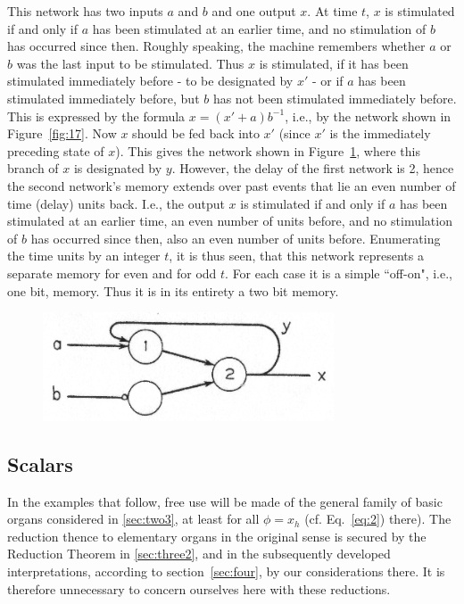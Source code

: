 \documentclass[twocolumn,preprintnumbers,amsmath,amssymb,floatfix]{revtex4}
\begin{document}
This network has two inputs $a$ and $b$ and one output $x$. At
time $t$, $x$ is stimulated if and only if $a$ has been stimulated
at an earlier time, and no stimulation of $b$ has occurred since
then. Roughly speaking, the machine remembers whether $a$ or $b$
was the last input to be stimulated. Thus $x$ is stimulated, if it
has been stimulated immediately before - to be designated by $x'$
- or if $a$ has been stimulated immediately before, but $b$ has
not been stimulated immediately before. This is expressed by the
formula $x=(x'+a)b^{-1}$, i.e., by the network shown in
Figure~\ref{fig:17}. Now $x$ should be fed back into $x'$ (since
$x'$ is the immediately preceding state of $x$). This gives the
network shown in Figure~\ref{fig:18}, where this branch of $x$ is
designated by $y$. However, the delay of the first network is 2,
hence the second network's memory extends over past events that
lie an even number of time (delay) units back. I.e., the output
$x$ is stimulated if and only if $a$ has been stimulated at an
earlier time, an even number of units before, and no stimulation
of $b$ has occurred since then, also an even number of units
before. Enumerating the time units by an integer $t$, it is thus
seen, that this network represents a separate memory for even and
for odd $t$. For each case it is a simple ``off-on", i.e., one
bit, memory. Thus it is in its entirety a two bit memory.

\begin{figure}[t]
\includegraphics[width=3.4in]{fig_18}
\caption{\label{fig:18}}
\end{figure}

\subsection{\label{sec:six2}Scalars}

In the examples that follow, free use will be made of the general
family of basic organs considered in \ref{sec:two3}, at least for
all $\phi = x_h$ (cf. Eq.~\ref{eq:2}) there). The reduction thence
to elementary organs in the original sense is secured by the
Reduction Theorem in \ref{sec:three2}, and in the subsequently
developed interpretations, according to section~\ref{sec:four}, by
our considerations there. It is therefore unnecessary to concern
ourselves here with these reductions.
\end{document}

